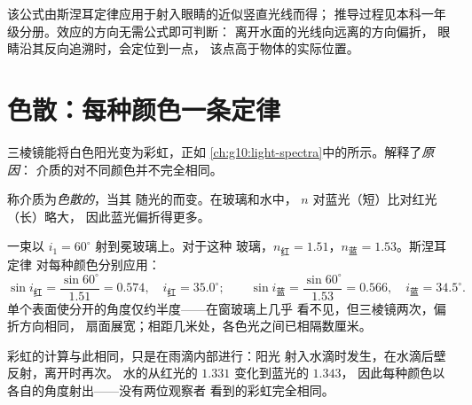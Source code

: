 \begin{remark}\label{rem:g10:refraction:depthhonest}
该公式由斯涅耳定律应用于射入眼睛的近似竖直光线而得；
推导过程见本科一年级分册。效应的方向无需公式即可判断：
离开水面的光线向远离的方向偏折，
眼睛沿其反向追溯时，会定位到一点，
该点高于物体的实际位置。
\end{remark}

\section{色散：每种颜色一条定律}

三棱镜能将白色阳光变为彩虹，正如
\cref{ch:g10:light-spectra}中的所示。解释了\emph{原因}：
介质的对不同颜色并不完全相同。

\begin{definition}[色散]\label{def:g10:refraction:dispersion}
称介质为\emph{色散的}，当其
随光的而变。在玻璃和水中，
$n$ 对蓝光（短）比对红光（长）略大，
因此蓝光偏折得更多。
\end{definition}

\begin{example}\label{ex:g10:refraction:twocolors}
一束以 $i_1 = 60^\circ$ 射到冕玻璃上。对于这种
玻璃，$n_{\text{红}} = 1.51$，$n_{\text{蓝}} = 1.53$。斯涅耳定律
对每种颜色分别应用：
\[
\sin i_{\text{红}} = \frac{\sin 60^\circ}{1.51} = 0.574,
\quad i_{\text{红}} = 35.0^\circ ;
\qquad
\sin i_{\text{蓝}} = \frac{\sin 60^\circ}{1.53} = 0.566,
\quad i_{\text{蓝}} = 34.5^\circ .
\]
单个表面使分开的角度仅约半度——在窗玻璃上几乎
看不见，但三棱镜两次，偏折方向相同，
扇面展宽；相距几米处，各色光之间已相隔数厘米。
\end{example}

\begin{remark}\label{rem:g10:refraction:rainbow}
彩虹的计算与此相同，只是在雨滴内部进行：阳光
射入水滴时发生，在水滴后壁反射，离开时再次。
水的从红光的 $1.331$ 变化到蓝光的 $1.343$，
因此每种颜色以各自的角度射出——没有两位观察者
看到的彩虹完全相同。
\end{remark}

